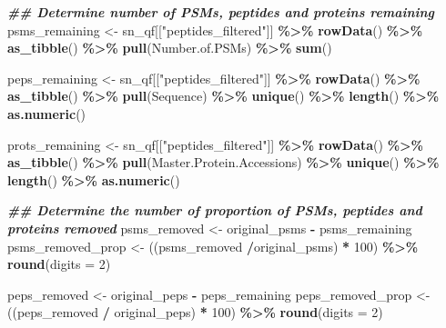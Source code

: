 \documentclass[9pt,a4paper,]{extarticle}
\newenvironment{Shaded}{\begin{snugshade}}{\end{snugshade}}
\newcommand{\AttributeTok}[1]{\textcolor[rgb]{0.13,0.29,0.53}{#1}}
\newcommand{\DecValTok}[1]{\textcolor[rgb]{0.00,0.00,0.81}{#1}}
\newcommand{\DocumentationTok}[1]{\textcolor[rgb]{0.56,0.35,0.01}{\textbf{\textit{#1}}}}
\newcommand{\FunctionTok}[1]{\textcolor[rgb]{0.13,0.29,0.53}{\textbf{#1}}}
\newcommand{\NormalTok}[1]{#1}
\newcommand{\OtherTok}[1]{\textcolor[rgb]{0.56,0.35,0.01}{#1}}
\newcommand{\SpecialCharTok}[1]{\textcolor[rgb]{0.81,0.36,0.00}{\textbf{#1}}}
\newcommand{\StringTok}[1]{\textcolor[rgb]{0.31,0.60,0.02}{#1}}
\begin{document}
\begin{Shaded}
\begin{Highlighting}[]
\DocumentationTok{\#\# Determine number of PSMs, peptides and proteins remaining}
\NormalTok{psms\_remaining }\OtherTok{\textless{}{-}}\NormalTok{ sn\_qf[[}\StringTok{"peptides\_filtered"}\NormalTok{]] }\SpecialCharTok{\%\textgreater{}\%}
  \FunctionTok{rowData}\NormalTok{() }\SpecialCharTok{\%\textgreater{}\%} 
  \FunctionTok{as\_tibble}\NormalTok{() }\SpecialCharTok{\%\textgreater{}\%} 
  \FunctionTok{pull}\NormalTok{(Number.of.PSMs) }\SpecialCharTok{\%\textgreater{}\%} 
  \FunctionTok{sum}\NormalTok{() }

\NormalTok{peps\_remaining }\OtherTok{\textless{}{-}}\NormalTok{ sn\_qf[[}\StringTok{"peptides\_filtered"}\NormalTok{]] }\SpecialCharTok{\%\textgreater{}\%}
  \FunctionTok{rowData}\NormalTok{() }\SpecialCharTok{\%\textgreater{}\%} 
  \FunctionTok{as\_tibble}\NormalTok{() }\SpecialCharTok{\%\textgreater{}\%} 
  \FunctionTok{pull}\NormalTok{(Sequence) }\SpecialCharTok{\%\textgreater{}\%} 
  \FunctionTok{unique}\NormalTok{() }\SpecialCharTok{\%\textgreater{}\%}
  \FunctionTok{length}\NormalTok{() }\SpecialCharTok{\%\textgreater{}\%}
  \FunctionTok{as.numeric}\NormalTok{()}

\NormalTok{prots\_remaining }\OtherTok{\textless{}{-}}\NormalTok{ sn\_qf[[}\StringTok{"peptides\_filtered"}\NormalTok{]] }\SpecialCharTok{\%\textgreater{}\%}
  \FunctionTok{rowData}\NormalTok{() }\SpecialCharTok{\%\textgreater{}\%} 
  \FunctionTok{as\_tibble}\NormalTok{() }\SpecialCharTok{\%\textgreater{}\%} 
  \FunctionTok{pull}\NormalTok{(Master.Protein.Accessions) }\SpecialCharTok{\%\textgreater{}\%} 
  \FunctionTok{unique}\NormalTok{() }\SpecialCharTok{\%\textgreater{}\%} 
  \FunctionTok{length}\NormalTok{() }\SpecialCharTok{\%\textgreater{}\%}
  \FunctionTok{as.numeric}\NormalTok{()}

\DocumentationTok{\#\# Determine the number of proportion of PSMs, peptides and proteins removed}
\NormalTok{psms\_removed }\OtherTok{\textless{}{-}}\NormalTok{ original\_psms }\SpecialCharTok{{-}}\NormalTok{ psms\_remaining}
\NormalTok{psms\_removed\_prop }\OtherTok{\textless{}{-}}\NormalTok{ ((psms\_removed }\SpecialCharTok{/}\NormalTok{original\_psms) }\SpecialCharTok{*} \DecValTok{100}\NormalTok{) }\SpecialCharTok{\%\textgreater{}\%}
  \FunctionTok{round}\NormalTok{(}\AttributeTok{digits =} \DecValTok{2}\NormalTok{)}

\NormalTok{peps\_removed }\OtherTok{\textless{}{-}}\NormalTok{ original\_peps }\SpecialCharTok{{-}}\NormalTok{ peps\_remaining}
\NormalTok{peps\_removed\_prop }\OtherTok{\textless{}{-}}\NormalTok{ ((peps\_removed }\SpecialCharTok{/}\NormalTok{ original\_peps) }\SpecialCharTok{*} \DecValTok{100}\NormalTok{) }\SpecialCharTok{\%\textgreater{}\%}
  \FunctionTok{round}\NormalTok{(}\AttributeTok{digits =} \DecValTok{2}\NormalTok{)}


\end{Highlighting}
\end{Shaded}
\end{document}
